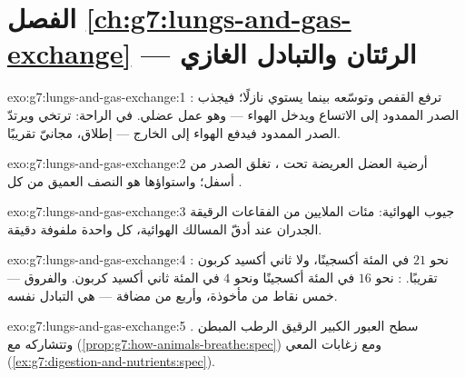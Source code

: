 \section*{الفصل \ref{ch:g7:lungs-and-gas-exchange} --- الرئتان والتبادل الغازي}

\begin{solution}{exo:g7:lungs-and-gas-exchange:1}
:   ترفع القفص وتوسّعه بينما يستوي 
نازلًا؛ فيجذب الصدر الممدود  إلى الاتساع ويدخل الهواء ---
وهو عمل عضلي.  في الراحة: ترتخي  ويرتدّ الصدر
الممدود فيدفع الهواء إلى الخارج --- إطلاق، مجانيّ تقريبًا.
\end{solution}

\begin{solution}{exo:g7:lungs-and-gas-exchange:2}
أرضية العضل العريضة تحت ، تغلق الصدر من أسفل؛ واستواؤها هو
النصف العميق من كل .
\end{solution}

\begin{solution}{exo:g7:lungs-and-gas-exchange:3}
جيوب  الهوائية: مئات الملايين من الفقاعات الرقيقة الجدران
عند أدقّ  المسالك الهوائية، كل واحدة ملفوفة 
دقيقة.
\end{solution}

\begin{solution}{exo:g7:lungs-and-gas-exchange:4}
: نحو $21$ في المئة أكسجينًا، ولا ثاني أكسيد كربون تقريبًا.
: نحو $16$ في المئة أكسجينًا ونحو $4$ في المئة ثاني أكسيد
كربون. والفروق --- خمس نقاط من  مأخوذة، وأربع من  مضافة --- هي التبادل نفسه.
\end{solution}

\begin{solution}{exo:g7:lungs-and-gas-exchange:5}
سطح العبور الكبير الرقيق الرطب المبطن . وتتشاركه مع 
 (\cref{prop:g7:how-animals-breathe:spec}) ومع زغابات المعي
(\cref{ex:g7:digestion-and-nutrients:spec}).
\end{solution}

